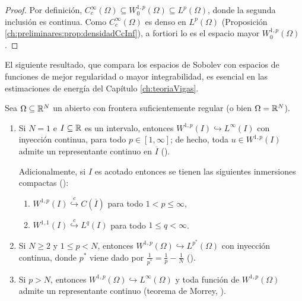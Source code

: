 \begin{proof}
Por definición, $C_c^\infty(\Omega) \subseteq W_0^{1,p}(\Omega) \subseteq L^p(\Omega)$,
donde la segunda inclusión es continua. Como $C_c^\infty(\Omega)$ es denso en
$L^p(\Omega)$ (Proposición \ref{ch:preliminares:prop:densidadCcInf}), a fortiori
lo es el espacio mayor $W_0^{1,p}(\Omega)$.
\end{proof}

El siguiente resultado, que compara los espacios de Sobolev con espacios de
funciones de mejor regularidad o mayor integrabilidad, es esencial en las
estimaciones de energía del Capítulo \ref{ch:teoriaVigas}.\\

\begin{Teorema}
\label{ch:preliminares:th:inmersionesSobolev}

Sea $\Omega \subseteq \mathbb{R}^N$ un abierto con frontera suficientemente regular
(o bien $\Omega = \mathbb{R}^N$).

\begin{enumerate}
    \item Si $N = 1$ e $I \subseteq \mathbb{R}$ es un intervalo, entonces
    $W^{1,p}(I) \hookrightarrow L^\infty(I)$ con inyección continua, para todo
    $p \in [1, \infty]$; de hecho, toda $u \in W^{1,p}(I)$ admite un representante
    continuo en $\overline{I}$ (\cite[Teorema~8.8]{brezis-2011-fun-ana-sob}).

    Adicionalmente, si $I$ es acotado entonces se tienen las siguientes inmersiones compactas (\cite[Teorema~8.8]{brezis-2011-fun-ana-sob}):
    \begin{enumerate}
        \item $W^{1,p}(I) \overset{c}{\hookrightarrow} C(\overline{I})$ para todo $1 < p \leq \infty$,
        \item $W^{1,1}(I) \overset{c}{\hookrightarrow} L^q(I)$ para todo $1 \leq q < \infty$.
    \end{enumerate}

    \item Si $N \geq 2$ y $1 \leq p < N$, entonces
    $W^{1,p}(\Omega) \hookrightarrow L^{p^*}(\Omega)$ con inyección continua,
    donde $p^*$ viene dado por $\tfrac{1}{p^*} = \tfrac{1}{p} - \tfrac{1}{N}$
    (\cite[Teorema~9.9]{brezis-2011-fun-ana-sob}).

    \item Si $p > N$, entonces $W^{1,p}(\Omega) \hookrightarrow L^\infty(\Omega)$
    y toda función de $W^{1,p}(\Omega)$ admite un representante continuo (teorema
    de Morrey, \cite[Teorema~9.12]{brezis-2011-fun-ana-sob}).
\end{enumerate}
\end{Teorema}

